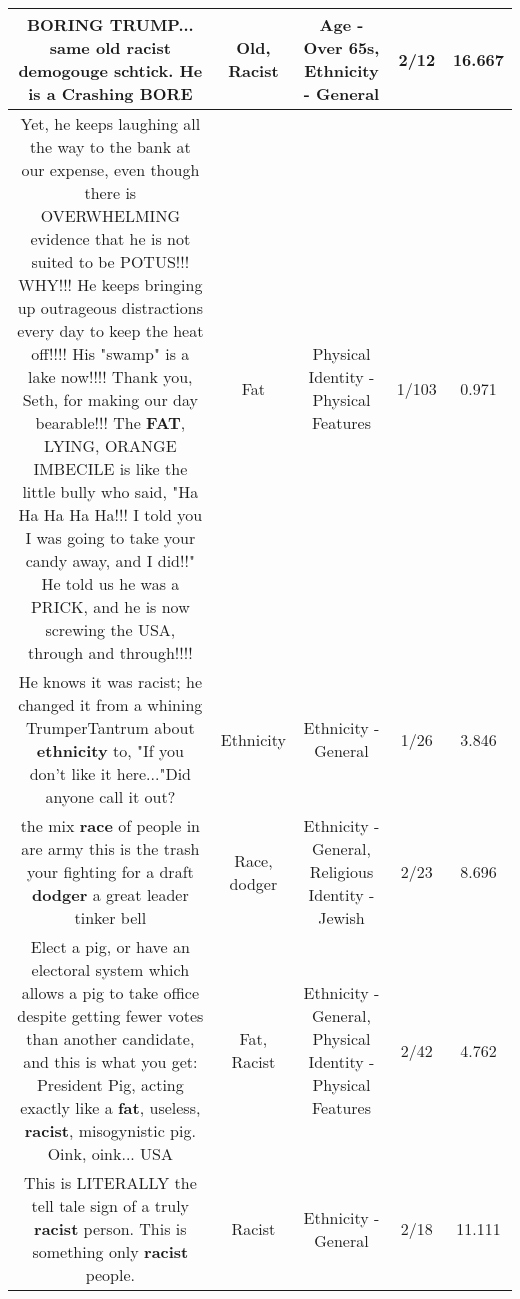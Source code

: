\documentclass[11pt]{article}
\newlength\mylength
\begin{document}
\begin{center}
\begin{longtable}{|C{.65\mylength}|C{.30\mylength}|C{.12\mylength}|C{.12\mylength}|C{.12\mylength}|}
  \small BORING TRUMP... same \textbf{old} \textbf{racist} demogouge schtick.  He is a Crashing BORE\normalsize   & Old, Racist & Age - Over 65s, Ethnicity - General & 2/12 & 16.667 \\  \hline
  \small Yet, he keeps laughing all the way to the bank at our expense, even though there is OVERWHELMING evidence that he is not suited to be POTUS!!!  WHY!!!   He keeps bringing up outrageous distractions every day to keep the heat off!!!!  His "swamp" is a lake now!!!!  Thank you, Seth, for making our day bearable!!!  The \textbf{FAT}, LYING, ORANGE IMBECILE is like the little bully who said, "Ha Ha Ha Ha Ha!!!  I told you I was going to take your candy away, and I did!!"  He told us he was a PRICK, and he is now screwing the USA, through and through!!!!\normalsize   & Fat & Physical Identity - Physical Features & 1/103 & 0.971 \\  \hline
  \small He knows it was racist; he changed it from a whining TrumperTantrum about \textbf{ethnicity} to, "If you don't like it here..."Did anyone call it out?\normalsize   & Ethnicity & Ethnicity - General & 1/26 & 3.846 \\  \hline
  \small the mix  \textbf{race} of people in are army  this is the trash your fighting for a draft \textbf{dodger} a great leader tinker bell\normalsize   & Race, dodger & Ethnicity - General, Religious Identity - Jewish & 2/23 & 8.696 \\  \hline
  \small Elect a pig, or have an electoral system which allows a pig to take office despite getting fewer votes than another candidate, and this is what you get: President Pig, acting exactly like a \textbf{fat}, useless, \textbf{racist}, misogynistic pig. Oink, oink... USA\normalsize   & Fat, Racist & Ethnicity - General, Physical Identity - Physical Features & 2/42 & 4.762 \\  \hline
  \small This is LITERALLY the tell tale sign of a truly \textbf{racist} person. This is something only \textbf{racist} people.\normalsize   & Racist & Ethnicity - General & 2/18 & 11.111 \\  \hline

\end{longtable}
\end{center}
\end{document}

